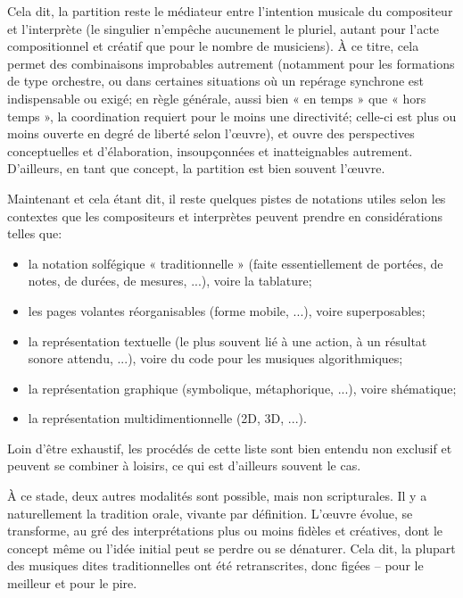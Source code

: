 \documentclass{article}
\begin{document}
Cela dit, la partition reste le médiateur entre l'intention musicale du compositeur et l'interprète (le singulier n'empêche aucunement le pluriel, autant pour l'acte compositionnel et créatif que pour le nombre de musiciens). À ce titre, cela permet des combinaisons improbables autrement (notamment pour les formations de type orchestre, ou dans certaines situations où un repérage synchrone est indispensable ou exigé; en règle générale, aussi bien « en temps » que « hors temps », la coordination requiert pour le moins une directivité; celle-ci est plus ou moins ouverte en degré de liberté selon l'œuvre), et ouvre des perspectives conceptuelles et d'élaboration, insoupçonnées et inatteignables autrement. D'ailleurs, en tant que concept, la partition est bien souvent l'œuvre.  

\bigskip

Maintenant et cela étant dit, il reste quelques pistes de notations utiles selon les contextes que les compositeurs et interprètes peuvent prendre en considérations telles que:

\begin{itemize}
\item la notation solfégique « traditionnelle » (faite essentiellement de portées, de notes, de durées, de mesures, ...), voire la tablature;
\item les pages volantes réorganisables  (forme mobile, ...), voire superposables;
\item la représentation textuelle (le plus souvent lié à une action, à un résultat sonore attendu, ...), voire du code pour les musiques algorithmiques;
\item la représentation graphique (symbolique, métaphorique, ...), voire shématique;
\item la représentation multidimentionnelle (2D, 3D, ...).
\end{itemize}

Loin d'être exhaustif, les procédés de cette liste sont bien entendu non exclusif et peuvent se combiner à loisirs, ce qui est d'ailleurs souvent le cas.


\bigskip

À ce stade, deux autres modalités sont possible, mais non scripturales. Il y a naturellement la tradition orale, vivante par définition.  L'œuvre évolue, se transforme, au gré des interprétations plus ou moins fidèles et créatives, dont le concept même ou l'idée initial peut se perdre ou se dénaturer. Cela dit, la plupart des musiques dites traditionnelles ont été retranscrites, donc figées -- pour le meilleur et pour le pire. 
\end{document}
